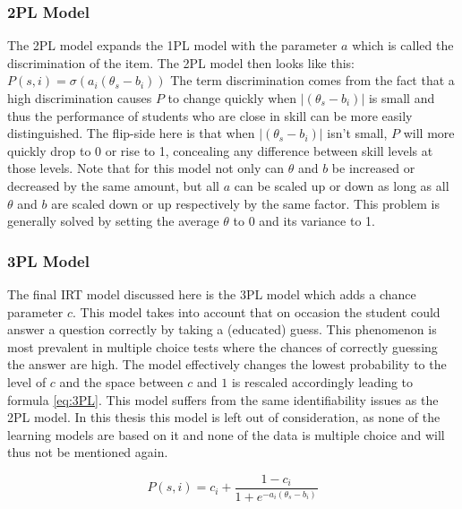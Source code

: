 \documentclass{scrartcl}
\begin{document}
\subsubsection{2PL Model}
The 2PL model expands the 1PL model with the parameter $a$ which is called the discrimination of the item. The 2PL model then looks like this: $P(s,i) = \sigma(a_{i} (\theta_{s} - b_{i}))$ The term discrimination comes from the fact that a high discrimination causes $P$ to change quickly when $|(\theta_{s} - b_{i})|$ is small and thus the performance of students who are close in skill can be more easily distinguished. The flip-side here is that when $|(\theta_{s} - b_{i})|$ isn't small, $P$ will more quickly drop to 0 or rise to 1, concealing any difference between skill levels at those levels. Note that for this model not only can $\theta$ and $b$ be increased or decreased by the same amount, but all $a$ can be scaled up or down as long as all $\theta$ and $b$ are scaled down or up respectively by the same factor. This problem is generally solved by setting the average $\theta$ to 0 and its variance to 1. 

\subsubsection{3PL Model}
The final IRT model discussed here is the 3PL model which adds a chance parameter $c$. This model takes into account that on occasion the student could answer a question correctly by taking a (educated) guess. This phenomenon is most prevalent in multiple choice tests where the chances of correctly guessing the answer are high. The model effectively changes the lowest probability to the level of $c$ and the space between $c$ and $1$ is rescaled accordingly leading to formula \ref{eq:3PL}. This model suffers from the same identifiability issues as the 2PL model. In this thesis this model is left out of consideration, as none of the learning models are based on it and none of the data is multiple choice and will thus not be mentioned again. 

\begin{equation}
\label{eq:3PL}
P(s,i)= c_{i} + \frac{1-c_{i}}{1+e^{-a_{i}(\theta_{s} - b_{i})}}
\end{equation}
\end{document}
